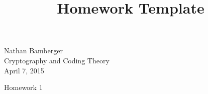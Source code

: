 \documentclass[11pt]{article}
\begin{document}
\def\bs{\textbackslash}
\setlength\parindent{0pt}
\def\reals{\hbox{\rm I\kern-.18em R}}
\def\complexes{\hbox{\rm C\kern-.43em
\vrule depth 0ex height 1.4ex width .05em\kern.41em}}
\def\field{\hbox{\rm I\kern-.18em F}} %
\title{Homework Template}
\setcounter{page}{1}
\begin{flushright}
Nathan Bamberger \\
Cryptography and Coding Theory \\
April 7, 2015
\end{flushright}
\begin{center}
Homework 1
\end{center}
\vspace{1ex}
\end{document}
